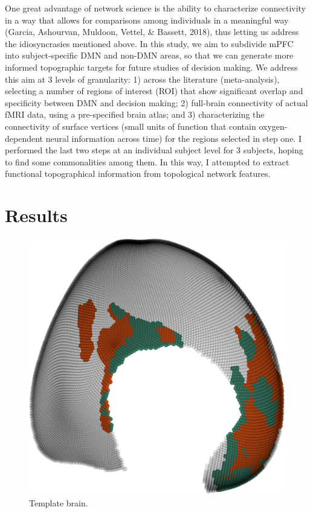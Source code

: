 \documentclass[9pt,twocolumn,twoside,]{pnas-new}
\begin{document}
One great advantage of network science is the ability to characterize
connectivity in a way that allows for comparisons among individuals in a
meaningful way (Garcia, Ashourvan, Muldoon, Vettel, \& Bassett, 2018),
thus letting us address the idiosyncrasies mentioned above. In this
study, we aim to subdivide mPFC into subject-specific DMN and non-DMN
areas, so that we can generate more informed topographic targets for
future studies of decision making. We address this aim at 3 levels of
granularity: 1) across the literature (meta-analysis), selecting a
number of regions of interest (ROI) that show significant overlap and
specificity between DMN and decision making; 2) full-brain connectivity
of actual fMRI data, using a pre-specified brain atlas; and 3)
characterizing the connectivity of surface vertices (small units of
function that contain oxygen-dependent neural information across time)
for the regions selected in step one. I performed the last two steps at
an individual subject level for 3 subjects, hoping to find some
commonalities among them. In this way, I attempted to extract functional
topographical information from topological network features.

\section*{Results}\label{results}

\begin{figure}
\centering
\includegraphics{Manuscript_files/figure-latex/Partition comparison: all brain example-1.pdf}
\caption{Template brain.}
\end{figure}
\end{document}
